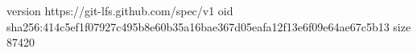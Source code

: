 version https://git-lfs.github.com/spec/v1
oid sha256:414c5ef1f07927c495b8e60b35a16bae367d05eafa12f13e6f09e64ae67c5b13
size 87420
